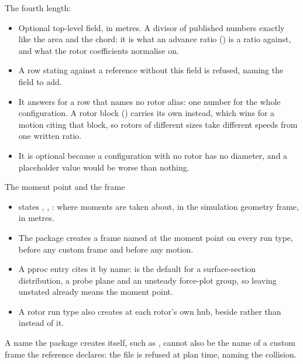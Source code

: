 \begin{frame}{The fourth length: }
\begin{itemize}\small
  \item Optional top-level field, in metres. A divisor of published numbers
        exactly like the area and the chord: it is what an advance ratio
        () is a ratio against, and what the rotor
        coefficients normalise on.
  \item A row stating  against a reference without
        this field is refused, naming the field to add.
  \item It answers for a row that names no rotor alias: one number for the
        whole configuration. A rotor block () carries
        its own  instead, which wins for a motion citing
        that block, so rotors of different sizes take different speeds
        from one written ratio.
  \item It is optional because a configuration with no rotor has no
        diameter, and a placeholder value would be worse than nothing.
\end{itemize}
\end{frame}

\begin{frame}{The moment point and the  frame}
\begin{itemize}\small
  \item {} states , , :
        where moments are taken about, in the simulation geometry frame,
        in metres.
  \item The package creates a frame named  at the moment point on
        every run type, before any custom frame and before any motion.
  \item A pproc entry cites it by name:  is the default
        for a surface-section distribution, a probe plane and an unsteady
        force-plot group, so leaving  unstated already means
        the moment point.
  \item A rotor run type also creates  at each rotor's
        own hub, beside  rather than instead of it.
\end{itemize}
\begin{ftsevidence}
A name the package creates itself, such as , cannot also be the
name of a custom frame the reference declares: the file is refused at plan
time, naming the collision.
\end{ftsevidence}
\end{frame}

